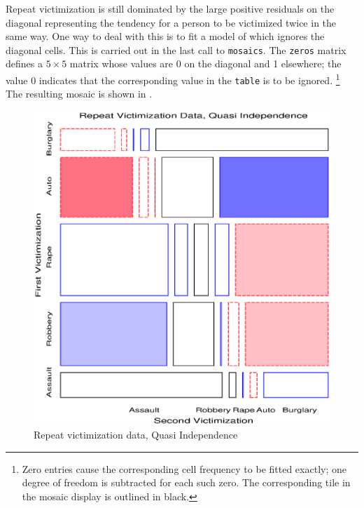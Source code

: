 \begin{Example}[victims]{Repeat victimization}
 is still dominated by the large positive residuals
on the diagonal representing the tendency for a person to be victimized
twice in the same way.  One way to deal with this is to fit a model
of  which ignores the diagonal cells.
This is carried out in the last call to \texttt{mosaics}.
The \texttt{zeros} matrix defines a $5 \times 5$ matrix whose values
are 0 on the diagonal and 1 elsewhere;
the value 0
indicates that the corresponding value in the \texttt{table} is to
be ignored.%
\footnote{
Zero entries cause the corresponding cell frequency to be
fitted exactly; one degree of freedom is subtracted for each
such zero.  The corresponding tile in the mosaic display is
outlined in black.}
The resulting mosaic is shown in .
\begin{figure}[htb]
  \centering
  \includegraphics[scale=.6]{ch4/fig/victims3}
  \caption{Repeat victimization data, Quasi Independence}%
  \label{fig:victims3}
\end{figure}
\end{Example}
